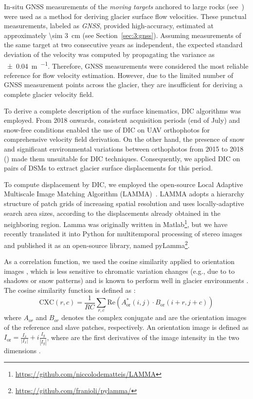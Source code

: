 In-situ GNSS measurements of the \textit{moving targets} anchored to large rocks (see~) were used as a method for deriving glacier surface flow velocities.
These punctual measurements, labeled as \textit{GNSS}, provided high-accuracy, 
estimated at approximately \qty{\sim 3}{\centi\meter} (see Section~\ref{sec:3:gnss}).
Assuming measurements of the same target at two consecutive years as independent, the expected standard deviation 
of the velocity was computed by propagating the variance as \qty{\pm 0.04}{\meter\per\year}.
Therefore, GNSS measurements were considered the most reliable reference for flow velocity estimation.
However, due to the limited number of GNSS measurement points across the glacier, they are insufficient 
for deriving a complete glacier velocity field.

To derive a complete description of the surface kinematics, DIC algorithms was employed. 
From 2018 onwards, consistent acquisition periods (end of July) and snow-free conditions enabled the use of DIC on UAV orthophotos for comprehensive velocity field derivation.
On the other hand, the presence of snow and significant environmental variations between orthophotos from 2015 to 2018
() made them unsuitable for DIC techniques.
Consequently, we applied DIC on pairs of DSMs \citep{Gindraux2019} to extract glacier surface displacements for this period.

To compute displacement by DIC, we employed the open-source Local Adaptive Multiscale Image Matching Algorithm (LAMMA)~\citep{Dematteis2022}.
LAMMA adopts a hierarchy structure of patch grids of increasing spatial resolution and uses locally-adaptive search area sizes, according to the displacements already
obtained in the neighboring region.
Lamma was originally written in Matlab\footnote{\url{https://github.com/niccolodematteis/LAMMA}}, but we have 
recently translated it into Python for multitemporal processing of stereo images \citep{ioli2024deep} and 
published it as an open-source library, named pyLamma\footnote{\url{https://github.com/franioli/pylamma/}}.

As a correlation function, we used the cosine similarity applied to orientation images \citep{Dematteis2021}, 
which is less sensitive to chromatic variation changes (e.g., due to to shadows or snow patterns) and is known 
to perform well in glacier environments \citep{Heid2012_evaluation_xcorr, Dematteis2019}.
The cosine similarity function is defined as \citep{Dematteis2022}:
\begin{equation}
\text{CXC}(r,c) = \frac{1}{RC} \sum_{r,c} \mathrm{Re} \left( A_{\text{or}}^{*}(i,j) \cdot B_{\text{or}}(i+r,j+c) \right)
\end{equation}
where $A_{or}$ and $B_{or}$ denotes the complex conjugate and are the orientation images of the 
reference and slave patches, respectively. 
An orientation image is defined as $ I_{\text{or}} = \frac{I_x}{|I_x|} + i\frac{I_y}{|I_y|} $, 
where are the first derivatives of the image intensity in the two dimensions \citep{fitch2002_OC}.


